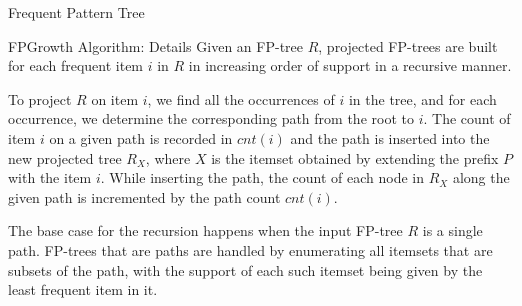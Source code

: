 \begin{frame}{Frequent Pattern Tree}
{{{      
    }
   }
  \hspace{0.2in}
    \label{fig:fpm:iset:APT5}
    \scalebox{0.4}{%
    \pstree[]{\Toval[edge=\bedge]{$\emptyset(5)$}}{
      \pstree[]{\Toval[edge=\bedge]{$B$(5)}}{
        \pstree[]{\Toval[edge=\bedge]{$E$(5)}}{
          \pstree[]{\Toval[edge=\bedge]{$A$(4)}}{
            \pstree{\Toval[edge=\bedge]{$C$(2)}}{
              \Toval[edge=\bedge]{$D$(1)}
            }
            \Toval{$D$(2)}
          }
          \Toval{$C$(1)}
       }
      }
    }
  }
  \hspace{0.2in}
    \label{fig:fpm:iset:APT6}
  }
\end{frame}


\begin{frame}{FPGrowth Algorithm: Details}
Given an FP-tree $R$, projected FP-trees are built for each
frequent item $i$ in $R$ in increasing order of support in a recursive
manner.

\medskip
To project $R$ on item $i$, we f\/{i}nd
all the occurrences of $i$ in the tree, and for each occurrence,
we determine the corresponding path from the root to $i$.
The count of item $i$ on a given
path is recorded in $cnt(i)$
and the
path is inserted into the new projected tree $R_X$, where $X$ is
the itemset obtained by extending the pref\/{i}x $P$ with the item
$i$.  While inserting the path, the count of each node in $R_X$ along
the given path is incremented by the path count $cnt(i)$.


\medskip
The base case
for the recursion happens when the input FP-tree $R$ is a single
path. FP-trees that are paths are handled by enumerating all
itemsets that are subsets of the path, with the support of each
such itemset being given by the least frequent item in it.

\end{frame}


